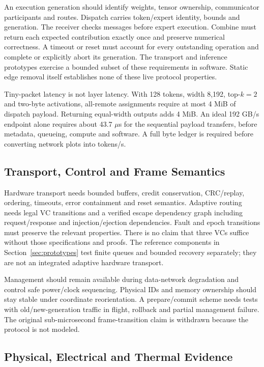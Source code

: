 \documentclass[11pt,a4paper]{article}
\begin{document}
An execution generation should identify weights, tensor ownership,
communicator participants and routes. Dispatch carries token/expert
identity, bounds and generation. The receiver checks messages before expert
execution. Combine must return each expected contribution exactly once and
preserve numerical correctness. A timeout or reset must account for every
outstanding operation and complete or explicitly abort its generation.
The transport and inference prototypes exercise a bounded subset of these
requirements in software. Static edge removal itself establishes none of
these live protocol properties.

Tiny-packet latency is not layer latency. With 128 tokens, width 8,192,
top-$k=2$ and two-byte activations, all-remote assignments require at most
4 MiB of dispatch payload. Returning equal-width outputs adds 4 MiB. An
ideal 192 GB/s endpoint alone requires about 43.7 $\mu$s for the sequential
payload transfers, before metadata, queueing, compute and software. A full
byte ledger is required before converting network plots into tokens/s.

\subsection{Transport, Control and Frame Semantics}

Hardware transport needs bounded buffers, credit conservation, CRC/replay,
ordering, timeouts, error containment and reset semantics. Adaptive routing
needs legal VC transitions and a verified escape dependency graph including
request/response and injection/ejection dependencies. Fault and epoch
transitions must preserve the relevant properties. There is no claim that
three VCs suffice without those specifications and proofs. The reference
components in Section~\ref{sec:prototypes} test finite queues and bounded
recovery separately; they are not an integrated adaptive hardware transport.

Management should remain available during data-network degradation and
control safe power/clock sequencing. Physical IDs and memory ownership
should stay stable under coordinate reorientation. A prepare/commit scheme
needs tests with old/new-generation traffic in flight, rollback and partial
management failure. The original sub-microsecond frame-transition claim is
withdrawn because the protocol is not modeled.

\subsection{Physical, Electrical and Thermal Evidence}
\end{document}
